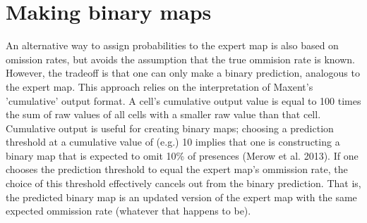 \section{Making binary maps}%


An alternative way to assign probabilities to the expert map is also based on omission rates, but avoids the assumption that the true ommision rate is known. However, the tradeoff is that one can only make a binary prediction, analogous to the expert map. This approach relies on the interpretation of Maxent's 'cumulative' output format. A cell's cumulative output value is equal to 100 times the sum of raw values of all cells with a smaller raw value than that cell. Cumulative output is useful for creating binary maps; choosing a prediction threshold at a cumulative value of (e.g.) 10 implies that one is constructing a binary map that is expected to omit 10\% of presences (Merow et al. 2013). If one chooses the prediction threshold to equal the expert map's ommission rate, the choice of this threshold effectively cancels out from the binary prediction. That is, the predicted binary map is an updated version of the expert map with the same expected ommission rate (whatever that happens to be). 
